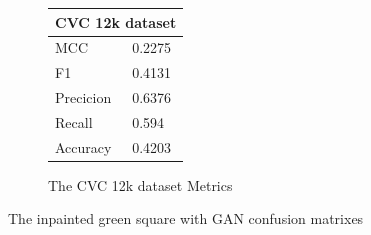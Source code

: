 \begin{figure}
\begin{subfigure}[b]{0.25\textwidth}
        \begin{tabular}{ll}
        \toprule
        \multicolumn{2}{c}{CVC 12k dataset}        \\
        \midrule
        MCC 		& 0.2275 \\
        F1  		& 0.4131 \\
        Precicion  	& 0.6376 \\
        Recall     	& 0.594 \\
        Accuracy	& 0.4203 \\
        \bottomrule
        \end{tabular}
\caption{The CVC 12k dataset Metrics}
\label{tab:cvc12k_metrics_DN121_GAN_SQUARE}
\end{subfigure}
\caption{The inpainted green square with GAN confusion matrixes}
\label{fig:results_DN121_GAN_SQUARE}
\end{figure}
\FloatBarrier



